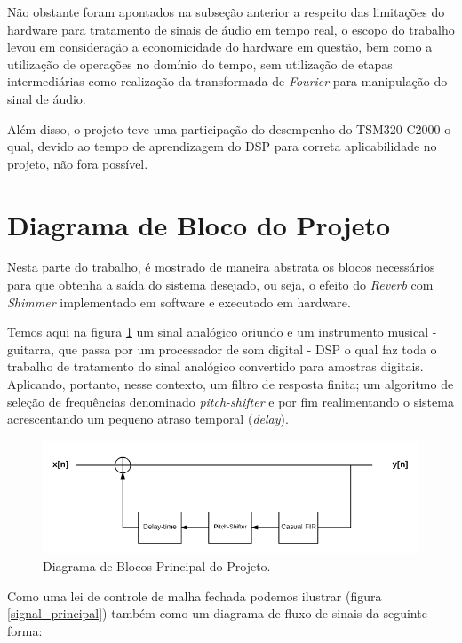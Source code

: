 	Não obstante foram apontados na subseção anterior a respeito das limitações do hardware para tratamento de sinais de áudio em tempo real, o escopo do trabalho levou em consideração a economicidade do hardware em questão, bem como a utilização de operações no domínio do tempo, sem utilização de etapas intermediárias como realização da transformada de \textit{Fourier} para manipulação do sinal de áudio. %
	
	Além disso, o projeto teve uma participação do desempenho do TSM320 C2000 o qual, devido ao tempo de aprendizagem do DSP para correta aplicabilidade no projeto, não fora possível. %


\section{Diagrama de Bloco do Projeto}

	Nesta parte do trabalho, é mostrado de maneira abstrata os blocos necessários para que obtenha a saída do sistema desejado, ou seja, o efeito do \textit{Reverb} com \textit{Shimmer} implementado em software e executado em hardware.
	
	Temos aqui na figura \ref{bloco-principal} um sinal analógico oriundo e um instrumento musical - guitarra, que passa por um processador de som digital - DSP o qual faz toda o trabalho de tratamento do sinal analógico convertido para amostras digitais. Aplicando, portanto, nesse contexto, um filtro de resposta finita; um algoritmo de seleção de frequências denominado \textit{pitch-shifter} e por fim realimentando o sistema acrescentando um pequeno atraso temporal (\textit{delay}).
	
	\begin{figure}[!h t b]
		\label{bloco-principal}
		\centering
		\includegraphics[scale=0.5]{./figuras/diagrama_bloco_principal.PNG}
		\caption{Diagrama de Blocos Principal do Projeto.}
	\end{figure}

	Como uma lei de controle de malha fechada podemos ilustrar (figura \ref{signal_principal}) também como um diagrama de fluxo de sinais da seguinte forma:
	
